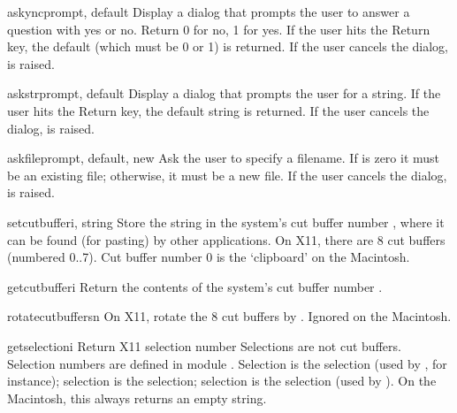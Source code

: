 \begin{funcdesc}{askync}{prompt, default}
Display a dialog that prompts the user to answer a question with yes or
no.  Return 0 for no, 1 for yes.  If the user hits the Return key, the
default (which must be 0 or 1) is returned.  If the user cancels the
dialog,  is raised.
\end{funcdesc}

\begin{funcdesc}{askstr}{prompt, default}
Display a dialog that prompts the user for a string.
If the user hits the Return key, the default string is returned.
If the user cancels the dialog,  is
raised.
\end{funcdesc}

\begin{funcdesc}{askfile}{prompt, default, new}
Ask the user to specify a filename.  If  is zero it must be
an existing file; otherwise, it must be a new file.  If the user
cancels the dialog,  is raised.
\end{funcdesc}

\begin{funcdesc}{setcutbuffer}{i, string}
Store the string in the system's cut buffer number , where it
can be found (for pasting) by other applications.  On X11, there are 8
cut buffers (numbered 0..7).  Cut buffer number 0 is the `clipboard'
on the Macintosh.
\end{funcdesc}

\begin{funcdesc}{getcutbuffer}{i}
Return the contents of the system's cut buffer number .
\end{funcdesc}

\begin{funcdesc}{rotatecutbuffers}{n}
On X11, rotate the 8 cut buffers by .  Ignored on the
Macintosh.
\end{funcdesc}

\begin{funcdesc}{getselection}{i}
Return X11 selection number   Selections are not cut buffers.
Selection numbers are defined in module .
Selection  is the  selection (used
by , for instance); selection 
is the  selection; selection  is
the  selection (used by ).  On the
Macintosh, this always returns an empty string.
\end{funcdesc}

